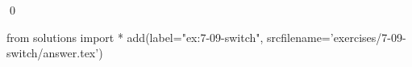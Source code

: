 
\begin{ex}
  \label{ex:7-09-switch}
  
  \qed
\end{ex}
\begin{python0}
from solutions import *
add(label="ex:7-09-switch",
    srcfilename='exercises/7-09-switch/answer.tex')
\end{python0}
